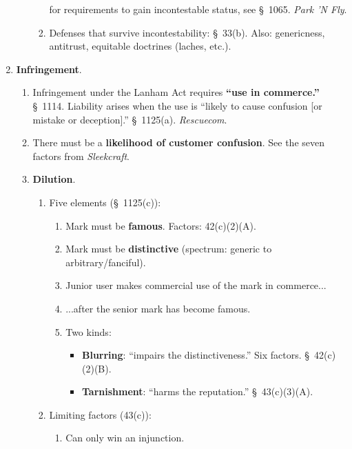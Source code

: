 \begin{enumerate}
\begin{enumerate}
\begin{enumerate}
            for requirements to gain incontestable status, see \S\ 1065. 
            \emph{Park 'N Fly}.
            \item Defenses that survive incontestability: \S\ 33(b). Also: 
            genericness, antitrust, equitable doctrines (laches, etc.).
        \end{enumerate}
    \end{enumerate}
    \item \textbf{Infringement}.
    \begin{enumerate}
        \item Infringement under the Lanham Act requires \textbf{``use in 
        commerce.''} \S\ 1114.  Liability arises when the use is ``likely to 
        cause confusion [or mistake or deception].'' \S\ 1125(a). 
        \emph{Rescuecom}.
        \item There must be a \textbf{likelihood of customer confusion}. See 
        the seven factors from \emph{Sleekcraft}.
        \item \textbf{Dilution}.
        \begin{enumerate}
            \item Five elements (\S\ 1125(c)):
            \begin{enumerate}
                \item Mark must be \textbf{famous}. Factors: 42(c)(2)(A).
                \item Mark must be \textbf{distinctive} (spectrum: generic to 
                arbitrary/fanciful).
                \item Junior user makes commercial use of the mark in 
                commerce...
                \item ...after the senior mark has become famous.
                \item Two kinds:
                \begin{itemize}
                    \item \textbf{Blurring}: ``impairs the distinctiveness.'' 
                    Six factors. \S\ 42(c)(2)(B).
                    \item \textbf{Tarnishment}: ``harms the reputation.'' \S\ 
                    43(c)(3)(A).
                \end{itemize}
            \end{enumerate}
            \item Limiting factors (43(c)):
            \begin{enumerate}
                \item Can only win an injunction.

\end{enumerate}
\end{enumerate}
\end{enumerate}
\end{enumerate}
